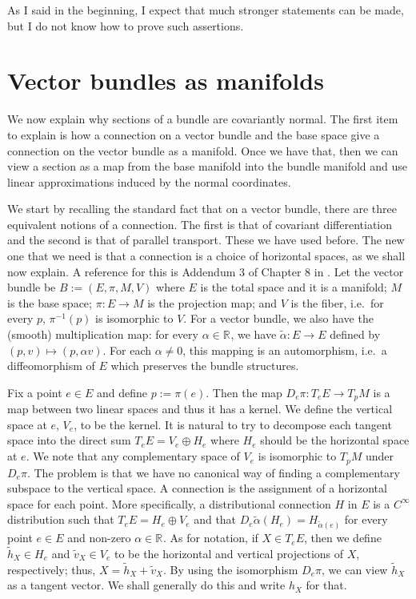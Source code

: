 \documentclass[11pt]{article}
\theoremstyle{remark}
\begin{document}
As I said in the beginning,  I expect that much stronger statements
can be made, but I do not know how to prove such assertions.


\section{Vector bundles as manifolds} \label{s:vecman}

We now explain why sections of a bundle are covariantly normal. 
 The first item to explain is how a
connection on a vector bundle and the base space give a connection on
the vector bundle as a manifold. Once we have that, then we can view a
section as a map from the base manifold into the bundle manifold and
use linear approximations induced by the normal coordinates. 

We start by recalling the standard fact that on a vector bundle, there
are three equivalent notions of a connection. The first is that of
covariant differentiation and the second is that of parallel
transport. These we have used before. The new one that we need is that
a connection is a choice of horizontal spaces, as we shall now
explain. A reference for this is Addendum 3 of Chapter 8 in \cite{Sp299}. 
Let the vector bundle be $B \ensuremath{:=} (E,\pi, M, V)$  
where $E$ is the total space and it is a manifold;  $M$ is the base
space; $\pi: E \to M$ is the projection map; and $V$ is the fiber,
i.e.\ for every $p$,  $\pi^{-1} (p)$ is isomorphic to $V$.  
For a vector bundle, we also have the (smooth) 
multiplication map: for every $\alpha
\in \ensuremath{\mathbb{R}^{}}$, we have $\tilde{\alpha}: E \to E$ defined by $(p, v)
\mapsto (p, \alpha v)$. For each $\alpha \neq 0$, this mapping is an 
automorphism, i.e.\ a diffeomorphism of $E$ which preserves the bundle
structures. 

Fix a point $e
\in E$ and define $p \ensuremath{:=} \pi(e)$. Then the map $D_e \pi : T_e E \to
T_pM$ is a map between two linear spaces and thus it has a kernel. We
define the  vertical space at $e$, $V_e$, to be the kernel.   
It is natural to try to  decompose
each tangent space into the direct sum $T_e E = V_e \oplus H_e$ where
$H_e$ should be  the horizontal space at $e$. 
We note that any complementary space of $V_e$ is isomorphic 
to $T_p M$ under $D_e \pi$.
The problem is that we have
no canonical way of finding a complementary subspace to the vertical
space. A connection is the assignment of a horizontal space for each
point. 
More
specifically, a distributional connection $H$ in $E$ is a $C^\infty$
distribution such that  $T_eE = H_e \oplus V_e$ 
and that $D_e \tilde{\alpha} (H_e) = H_{\tilde {\alpha}(e)}$ 
for every point $e \in E$
and non-zero $\alpha \in \ensuremath{\mathbb{R}^{}}$. 
As for notation, if $X \in T_e E$, then we define $\tilde{h}_X \in H_e$ and
$\tilde{v}_X \in V_e$ to 
be the horizontal and vertical projections of $X$, respectively; 
thus,  $X = \tilde{h}_X +
\tilde{v}_X$. By using the isomorphism $D_e \pi$, we can view 
$\tilde{h}_X$ as a tangent vector. We shall generally do this and
write $h_X$ for that.  
\end{document}
